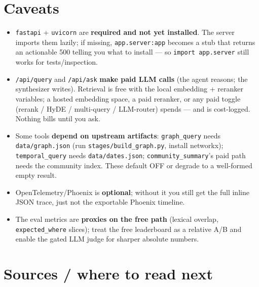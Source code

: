 \documentclass[11pt]{article}
\newcommand{\code}[1]{\texttt{#1}}
\begin{document}
\section{Caveats}

\begin{itemize}[leftmargin=1.4em]
  \item \code{fastapi} + \code{uvicorn} are \textbf{required and not yet
        installed}. The server imports them lazily; if missing,
        \code{app.server:app} becomes a stub that returns an actionable 500
        telling you what to install --- so \code{import app.server} still works
        for tests/inspection.
  \item \code{/api/query} and \code{/api/ask} \textbf{make paid LLM calls} (the
        agent reasons; the synthesizer writes). Retrieval is free with the local
        embedding + reranker variables; a hosted embedding space, a paid
        reranker, or any paid toggle (rerank / HyDE / multi-query / LLM-router)
        spends --- and is cost-logged. Nothing bills until you ask.
  \item Some tools \textbf{depend on upstream artifacts}: \code{graph\_query}
        needs \code{data/graph.json} (run \code{stages/build\_graph.py}, install
        networkx); \code{temporal\_query} needs \code{data/dates.json};
        \code{community\_summary}'s paid path needs the community index. These
        default OFF or degrade to a well-formed empty result.
  \item OpenTelemetry/Phoenix is \textbf{optional}; without it you still get the
        full inline JSON trace, just not the exportable Phoenix timeline.
  \item The eval metrics are \textbf{proxies on the free path} (lexical overlap,
        \code{expected\_where} slices); treat the free leaderboard as a relative
        A/B and enable the gated LLM judge for sharper absolute numbers.
\end{itemize}

\section{Sources / where to read next}
\end{document}
